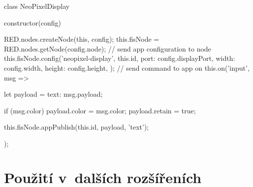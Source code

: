 \begin{code}[
    language=Javascript,
    label=code:fis-node-neopixel-display,
    caption={Implementace bloku pro aplikaci ovládající bodový displej -- kromě samotné konfigurace na cílovém uzlu
    si uzel zaregistruje funkci pro odběr události typu \ic{\'input\'}.
    Událost tohoto typu notifikuje blok o~příchozí zprávě, která je v~tomto případě odeslána do aplikace k~zobrazení
    na displeji.}
]
class NeoPixelDisplay {
    constructor(config) {
        RED.nodes.createNode(this, config);
        this.fisNode = RED.nodes.getNode(config.node);
        // send app configuration to node
        this.fisNode.config('neopixel-display', this.id, {
            port: config.displayPort,
            width: config.width,
            height: config.height,
        });
        // send command to app on
        this.on('input', msg => {
            let payload = {text: msg.payload};

            if (msg.color)
                payload.color = msg.color;
            payload.retain = true;

            this.fisNode.appPublish(this.id, payload, 'text');
        });
    }
}
\end{code}

\section{Použití v~dalších rozšířeních}\label{sec:pouziti-v-dalsich-rozsirenich}

